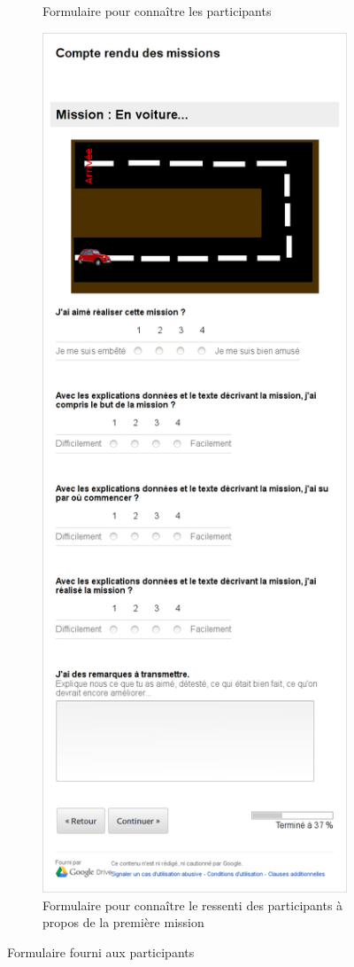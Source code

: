 \begin{figure}
\begin{center}
\begin{subfigure}[b]{.49\textwidth}
      \caption{Formulaire pour connaître les participants}
    \end{subfigure}
    \begin{subfigure}[b]{.49\textwidth}
      \includegraphics[width=\textwidth]{content/8-validation/images/form-car}
      \caption{Formulaire pour connaître le ressenti des participants à propos de la première mission}
    \end{subfigure}
    \caption{Formulaire fourni aux participants}
    \label{fig:form-user}
  \end{center}
\end{figure}

